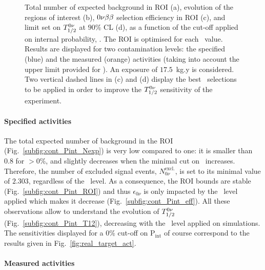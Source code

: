 \begin{figure}[!h]
\begin{subfigure}[t]{0.49\textwidth}
  \end{subfigure}
\caption{Total number of expected background in ROI (a),
  evolution of the regions of interest (b),
  $0\nu\beta\beta$ selection efficiency in ROI (c),
  and limit set on $T_{1/2}^{0\nu}$ at $90\%$ CL (d),
  as a function of the cut-off applied on internal probability, \Pint.
  The ROI is optimised for each \Pint\ value.
  Results are displayed for two contamination levels: the specified (blue) and the measured (orange) activities (taking into account the upper limit provided for \Bi).
  An exposure of $17.5$~kg.y is considered.
  Two vertical dashed lines in (c) and (d) display the best \Pint\ selections to be applied in order to improve the $T_{1/2}^{0\nu}$ sensitivity of the experiment.
  \label{fig:cont_Pint}}
\end{figure}

\paragraph{Specified activities}
The total expected number of background in the ROI (Fig.~\ref{subfig:cont_Pint_Nexp}) is very low compared to one: it is smaller than $0.8$ for \Pint$>0$\%, and slightly decreases when the minimal cut on \Pint\ increases.
Therefore, the number of excluded signal events, $N_{0\nu}^{\text{excl.}}$, is set to its minimal value of $2.303$, regardless of the \Pint\ level.
As a consequence, the ROI bounds are stable (Fig.~\ref{subfig:cont_Pint_ROI}) and thus $\epsilon_{0\nu}$ is only impacted by the \Pint\ level applied which makes it decrease (Fig.~\ref{subfig:cont_Pint_eff}).
All these observations allow to understand the evolution of $T_{1/2}^{0\nu}$ (Fig.~\ref{subfig:cont_Pint_T12}), decreasing with the \Pint\ level applied on simulations.
The sensitivities displayed for a $0\%$ cut-off on P$_{\text{int}}$ of course correspond to the results given in Fig.~\ref{fig:real_target_act}.

\paragraph{Measured activities}


